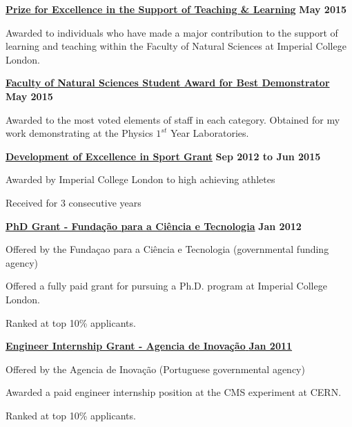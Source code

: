 \documentclass[10pt]{article}
\renewcommand{\section}[2]%
        {\pagebreak[2]\vspace{1.3\baselineskip}%
         \phantomsection\addcontentsline{toc}{section}{#1}%
         \hspace{0in}%
         \marginpar{
         \raggedright \scshape #1}#2}
\newenvironment{innerlist}[1][\enskip\textbullet]%
        {\begin{compactitem}[#1]}{\end{compactitem}}
\newcommand{\blankline}{\quad\pagebreak[2]}
\begin{document}
\section{Awards}

\href{https://www.imperial.ac.uk/natural-sciences/staff/fons-annual-prizes-for-excellence/}{\textbf{Prize for Excellence in the Support of Teaching \& Learning}} \hfill \textbf{May 2015}
\begin{innerlist}
\item Awarded to individuals who have made a major contribution to the support of learning and teaching within the Faculty of Natural Sciences at Imperial College London.
\end{innerlist}
\blankline

\href{https://www.imperial.ac.uk/natural-sciences/departments/physics/}{\textbf{Faculty of Natural Sciences Student Award for Best Demonstrator}} \hfill \textbf{May 2015}
\begin{innerlist}
\item Awarded to the most voted elements of staff in each category. Obtained for my work demonstrating at the Physics $1^{st}$ Year Laboratories.
\end{innerlist}
\blankline

\href{https://www.imperial.ac.uk/sport/performance-sport/sport-scholarships/developing-excellence-scheme-des/}{\textbf{Development of Excellence in Sport Grant}} \hfill \textbf{Sep 2012 to Jun 2015}
\begin{innerlist}
\item Awarded by Imperial College London to high achieving athletes
\item Received for 3 consecutive years
\end{innerlist}
\blankline

\href{http://www.fct.pt/}{\textbf{PhD Grant - Fundação para a Ciência e Tecnologia}} \hfill \textbf{Jan 2012}
\begin{innerlist}
  \item Offered by the Funda\c{c}ao para a Ci\^{e}ncia e Tecnologia (governmental funding agency)  
  \item Offered a fully paid grant for pursuing a Ph.D. program at Imperial College London.
  \item Ranked at top 10\% applicants.
\end{innerlist}
\blankline

\href{http://www.adi.pt/}{\textbf{Engineer Internship Grant - Agencia de Inovação} \hfill \textbf{Jan 2011}}
\begin{innerlist}
  \item Offered by the Agencia de Inovação (Portuguese governmental agency)  
  \item Awarded a paid engineer internship position at the CMS experiment at CERN.
  \item Ranked at top 10\% applicants. 
\end{innerlist}
\blankline
\end{document}
